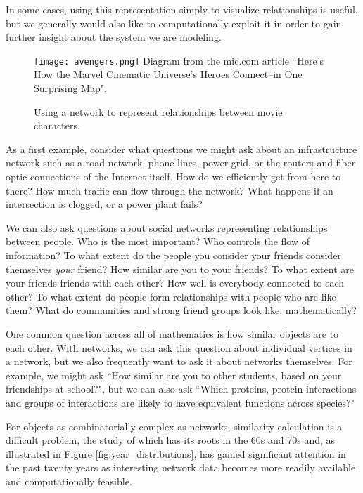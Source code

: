 \documentclass[12pt]{thesis}
\theoremstyle{plain}
\theoremstyle{definition}
\theoremstyle{remark}
\begin{document}
In some cases, using this representation simply to visualize relationships is useful, but we generally would also like to computationally exploit it in order to gain further insight about the system we are modeling. 

\begin{figure}
\centering
\vspace{-25pt}
\texttt{[image: avengers.png]}
\scriptsize
Diagram from the mic.com article ``Here's How the Marvel Cinematic Universe's Heroes Connect--in One Surprising Map".
\caption{Using a network to represent relationships between movie characters.}
\vspace{-20pt}
\label{fig:avengers}
\end{figure}

As a first example, consider what questions we might ask about an infrastructure network such as a road network, phone lines, power grid, or the routers and fiber optic connections of the Internet itself. How do we efficiently get from here to there? How much traffic can flow through the network? What happens if an intersection is clogged, or a power plant fails? 

We can also ask questions about social networks representing relationships between people. Who is the most important? Who controls the flow of information? To what extent do the people you consider your friends consider themselves \textit{your} friend?  How similar are you to your friends? To what extent are your friends friends with each other? How well is everybody connected to each other? To what extent do people form relationships with people who are like them? What do communities and strong friend groups look like, mathematically?

One common question across all of mathematics is how similar objects are to each other. With networks, we can ask this question about individual vertices in a network, but we also frequently want to ask it about networks themselves. For example, we might ask ``How similar are you to other students, based on your friendships at school?", but we can also ask ``Which proteins, protein interactions and groups of interactions are likely to have equivalent functions across species?" \cite{Sharan_2006}

For objects as combinatorially complex as networks, similarity calculation is a difficult problem, the study of which has its roots in the 60s and 70s \cite{Conte_2004} and, as illustrated in Figure \ref{fig:year_distributions}, has gained significant attention in the past twenty years as interesting network data becomes more readily available and computationally feasible.
\end{document}
